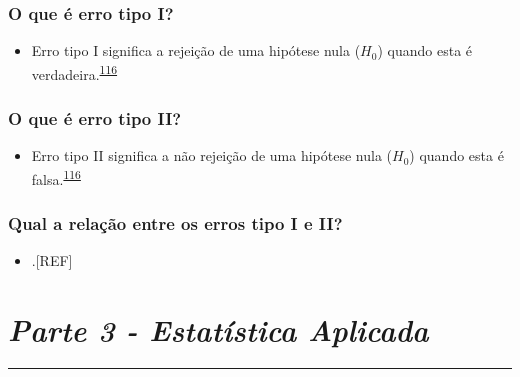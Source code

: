 \documentclass[
  a4paper,
]{book}
\providecommand{\tightlist}{%
  \setlength{\itemsep}{0pt}\setlength{\parskip}{0pt}}
\begin{document}
\hypertarget{o-que-uxe9-erro-tipo-i}{%
\subsection{O que é erro tipo I?}\label{o-que-uxe9-erro-tipo-i}}

\begin{itemize}
\tightlist
\item
  Erro tipo I significa a rejeição de uma hipótese nula (\(H_{0}\)) quando esta é verdadeira.\textsuperscript{\protect\hyperlink{ref-Curran-Everett2009}{116}}
\end{itemize}

\hypertarget{o-que-uxe9-erro-tipo-ii}{%
\subsection{O que é erro tipo II?}\label{o-que-uxe9-erro-tipo-ii}}

\begin{itemize}
\tightlist
\item
  Erro tipo II significa a não rejeição de uma hipótese nula (\(H_{0}\)) quando esta é falsa.\textsuperscript{\protect\hyperlink{ref-Curran-Everett2009}{116}}
\end{itemize}

\hypertarget{qual-a-relauxe7uxe3o-entre-os-erros-tipo-i-e-ii}{%
\subsection{Qual a relação entre os erros tipo I e II?}\label{qual-a-relauxe7uxe3o-entre-os-erros-tipo-i-e-ii}}

\begin{itemize}
\tightlist
\item
  .{[}REF{]}
\end{itemize}


\hypertarget{parte-3---estatuxedstica-aplicada}{%
\chapter*{\texorpdfstring{\emph{Parte 3 - Estatística Aplicada}}{Parte 3 - Estatística Aplicada}}\label{parte-3---estatuxedstica-aplicada}}

\markboth{}{}
\par\noindent\rule{\textwidth}{0.05in}
\end{document}
